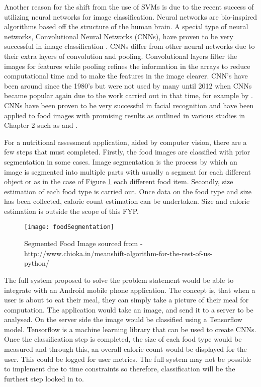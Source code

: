 Another reason for the shift from the use of SVMs is due to the recent success of utilizing neural networks for image classification.
Neural networks are bio-inspired algorithms based off the structure of the human brain.
A special type of neural networks, Convolutional Neural Networks (CNNs), have proven to be very successful in image classification \textcite{krizhevsky2012imagenet}.
CNNs differ from other neural networks due to their extra layers of convolution and pooling.
Convolutional layers filter the images for features while pooling refines the information in the arrays to reduce computational time and to make the features in the image clearer.
CNN's have been around since the 1980's \textcite{handsOnML} but were not used by many until 2012 when CNNs became popular again due to the work carried out in that time, for example by \textcite{krizhevsky2012imagenet}.
CNNs have been proven to be very successful in facial recognition and have been applied to food images with promising results as outlined in various studies in Chapter 2 such as \textcite{yanaiFood} and \textcite{deepLearning}.

For a nutritional assessment application, aided by computer vision, there are a
few steps that must completed. Firstly, the food images are classified with prior segmentation in some cases.
Image segmentation is the process by which an image is segmented into multiple parts with usually a segment for each different object or as in the case of Figure \ref{fig:foodSegment} each different food item.
Secondly, size estimation of each food type is carried out. Once data on the food type and size has been collected, calorie count estimation can be undertaken. Size and calorie estimation is outside the scope of this FYP.

\begin{figure}[h]
  \centering
  \texttt{[image: foodSegmentation]}
  \caption{Segmented Food Image sourced from - http://www.chioka.in/meanshift-algorithm-for-the-rest-of-us-python/}
  \label{fig:foodSegment}
\end{figure}


The full system proposed to solve the problem statement would be able to integrate with an Android mobile phone application.
The concept is, that when a user is about to eat their meal, they can simply take a picture of their meal for computation.
The application would take an image, and send it to a server to be analysed.
On the server side the image would be classified using a Tensorflow model.
Tensorflow is a machine learning library that can be used to create CNNs.
Once the classification step is completed, the size of each food type would be measured and through this, an overall calorie count would be displayed for the user.
This could be logged for user metrics.
The full system may not be possible to implement due to time constraints so therefore, classification will be the furthest step looked in to.

